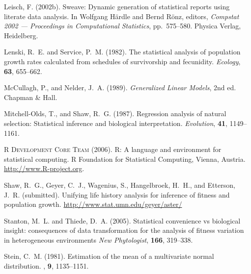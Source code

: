 \documentclass[11pt,twoside,notitlepage]{report}
\begin{document}
\begin{thebibliography}{}
Leisch, F. (2002b).
\newblock Sweave: Dynamic generation of statistical reports using
    literate data analysis.
\newblock In Wolfgang H\"{a}rdle and Bernd R\"{o}nz, editors,
    \emph{Compstat 2002 --- Proceedings in Computational Statistics},
    pp.~575--580.
\newblock Physica Verlag, Heidelberg.

Lenski, R.~E. and Service, P.~M. (1982).
\newblock The statistical analysis of population growth rates calculated
    from schedules of survivorship and fecunidity.
\newblock \emph{Ecology}, \textbf{63}, 655--662.

McCullagh, P., and Nelder, J.~A. (1989).
\newblock \emph{Generalized Linear Models}, 2nd ed.
\newblock Chapman \& Hall.

Mitchell-Olds, T., and Shaw, R.~G. (1987).
\newblock Regression analysis of natural selection: Statistical inference
    and biological interpretation.
\newblock \emph{Evolution}, \textbf{41}, 1149--1161.

\textsc{R Development Core Team} (2006).
\newblock R: A language and environment for statistical computing.
\newblock R Foundation for Statistical Computing, Vienna, Austria.
\newblock \url{http://www.R-project.org}.

Shaw, R.~G., Geyer, C.~J., Wagenius, S., Hangelbroek, H.~H., and
Etterson, J.~R. (submitted).
\newblock Unifying life history analysis for inference of fitness
    and population growth.
\newblock \url{http://www.stat.umn.edu/geyer/aster/}

Stanton, M.~L. and Thiede, D.~A. (2005).
\newblock Statistical convenience vs biological insight: consequences
    of data transformation
    for the analysis of fitness variation in heterogeneous environments
\newblock \emph{New Phytologist}, \textbf{166}, 319--338.

Stein, C.~M. (1981).
\newblock Estimation of the mean of a multivariate normal distribution.
, \textbf{9}, 1135--1151.


\end{thebibliography}
\end{document}
